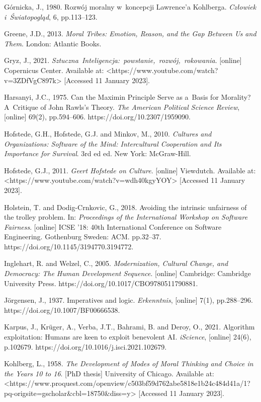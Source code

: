 Górnicka, J., 1980. Rozwój moralny w~koncepcji Lawrence'a Kohlberga. \textit{Człowiek i~Światopogląd}, 6, pp.113–123.

Greene, J.D., 2013. \textit{Moral Tribes: Emotion, Reason, and the Gap Between Us and Them}. London: Atlantic Books.

Gryz, J., 2021. \textit{Sztuczna~Inteligencja:~powstanie,~rozwój,~rokowania}. [online] Copernicus Center. Available at: {\textless}https://www.youtube.com/watch?v=3ZDfVgC897k{\textgreater} [Accessed 11 January 2023].

Harsanyi, J.C., 1975. Can the Maximin Principle Serve as a~Basis for Morality? A~Critique of John Rawls's Theory. \textit{The American Political Science Review}, [online] 69(2), pp.594–606. https://doi.org/10.2307/1959090.

Hofstede, G.H., Hofstede, G.J. and Minkov, M., 2010. \textit{Cultures and Organizations: Software of the Mind: Intercultural Cooperation and Its Importance for Survival}. 3rd ed ed. New York: McGraw-Hill.

Hofstede, G.J., 2011. \textit{Geert Hofstede on Culture}. [online] Viewdutch. Available at: {\textless}https://www.youtube.com/watch?v=wdh40kgyYOY{\textgreater} [Accessed 11 January 2023].

Holstein, T. and Dodig-Crnkovic, G., 2018. Avoiding the intrinsic unfairness of the trolley problem. In: \textit{Proceedings of the International Workshop on Software Fairness}. [online] ICSE '18: 40th International Conference on Software Engineering. Gothenburg Sweden: ACM. pp.32–37. https://doi.org/10.1145/3194770.3194772.

Inglehart, R. and Welzel, C., 2005. \textit{Modernization, Cultural Change, and Democracy: The Human Development Sequence}. [online] Cambridge: Cambridge University Press. https://doi.org/10.1017/CBO9780511790881.

Jörgensen, J., 1937. Imperatives and logic. \textit{Erkenntnis}, [online] 7(1), pp.288–296. https://doi.org/10.1007/BF00666538.

Karpus, J., Krüger, A., Verba, J.T., Bahrami, B. and Deroy, O., 2021. Algorithm exploitation: Humans are keen to exploit benevolent AI. \textit{iScience}, [online] 24(6), p.102679. https://doi.org/10.1016/j.isci.2021.102679.

Kohlberg, L., 1958. \textit{The Development of Modes of Moral Thinking and Choice in the Years 10 to 16}. [PhD thesis] University of Chicago. Available at: {\textless}https://www.proquest.com/openview/c503bf59d762abe5818e1b24c484d41a/1?pq-origsite=gscholar\&cbl=18750\&diss=y{\textgreater} [Accessed 11 January 2023].

